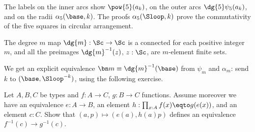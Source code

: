 \begin{marginfigure}
  \caption{The proof for the case $m=5$ around the clock.}
  \label{fig:psi-alpha-5-clock}
\end{marginfigure}
The labels on the inner arcs show $\pow{5}(a_k)$, on the
outer arcs $\dg{5}\psi_5(a_k)$, and on the radii
$\alpha_5(\base,k)$. The proofs $\alpha_5(\Sloop,k)$ prove
the commutativity of the five squares in circular arrangement.


\begin{corollary}\label{cor:dgm-conncov}
  The degree $m$ map $\dg{m}:\Sc\to\Sc$ is a connected \covering for
  each positive integer $m$, and all the preimages
  $\dg{m}^{-1}(z)$, $z:\Sc$, are $m$-element finite sets.
\end{corollary}
We get an explicit equivalence $\bn m \equiv \dg{m}^{-1}(\base)$ from $\psi_m$
and $\alpha_m$: send $k$ to $(\base,\Sloop^{-k})$, using the following exercise.

\begin{xca}\label{xca:preim-eq}
  Let $A,B,C$ be types and $f:A\to C$, $g:B\to C$ functions.
  Assume moreover we have an equivalence $e: A\to B$,
  an element $h: \prod_{x:A} f(x)\eqto g(e(x))$, and an element $c:C$.
  Show that $(a,p)\mapsto (e(a),h(a)p)$
  defines an equivalence $f^{-1}(c)\to g^{-1}(c)$.
\end{xca}

